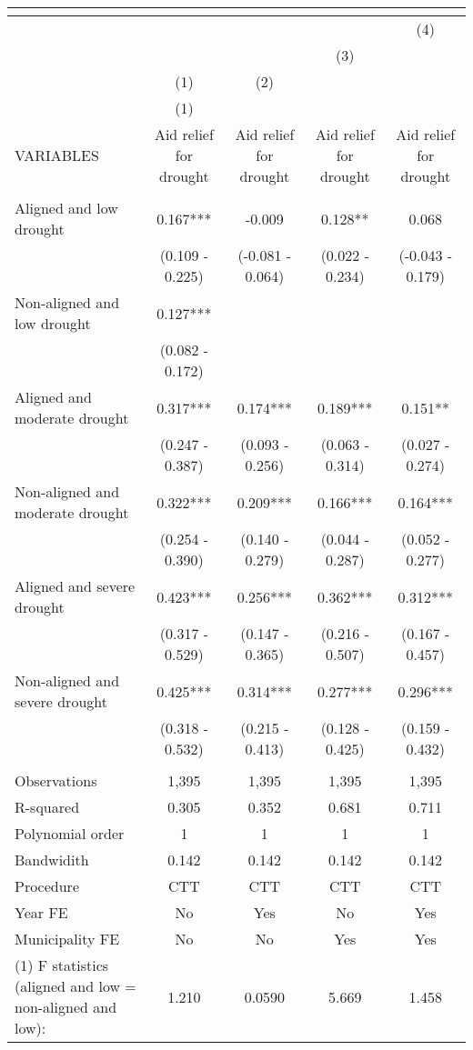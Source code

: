\begin{tabular}{lcccc}
\multicolumn{5}{c}{} \\ \hline
 &  &  &  & (4) \\
 &  &  & (3) &  \\
 & (1) & (2) &  &  \\
 & (1) &  &  &  \\
VARIABLES & Aid relief for drought & Aid relief for drought & Aid relief for drought & Aid relief for drought \\ \hline
 &  &  &  &  \\
Aligned and low drought & 0.167*** & -0.009 & 0.128** & 0.068 \\
 & (0.109 - 0.225) & (-0.081 - 0.064) & (0.022 - 0.234) & (-0.043 - 0.179) \\
Non-aligned and low drought & 0.127*** &  &  &  \\
 & (0.082 - 0.172) &  &  &  \\
Aligned and moderate drought & 0.317*** & 0.174*** & 0.189*** & 0.151** \\
 & (0.247 - 0.387) & (0.093 - 0.256) & (0.063 - 0.314) & (0.027 - 0.274) \\
Non-aligned and moderate drought & 0.322*** & 0.209*** & 0.166*** & 0.164*** \\
 & (0.254 - 0.390) & (0.140 - 0.279) & (0.044 - 0.287) & (0.052 - 0.277) \\
Aligned and severe drought & 0.423*** & 0.256*** & 0.362*** & 0.312*** \\
 & (0.317 - 0.529) & (0.147 - 0.365) & (0.216 - 0.507) & (0.167 - 0.457) \\
Non-aligned and severe drought & 0.425*** & 0.314*** & 0.277*** & 0.296*** \\
 & (0.318 - 0.532) & (0.215 - 0.413) & (0.128 - 0.425) & (0.159 - 0.432) \\
 &  &  &  &  \\
Observations & 1,395 & 1,395 & 1,395 & 1,395 \\
R-squared & 0.305 & 0.352 & 0.681 & 0.711 \\
Polynomial order & 1 & 1 & 1 & 1 \\
Bandwidith & 0.142 & 0.142 & 0.142 & 0.142 \\
Procedure & CTT & CTT & CTT & CTT \\
Year FE & No & Yes & No & Yes \\
Municipality FE & No & No & Yes & Yes \\
(1) F statistics (aligned and low = non-aligned and low): & 1.210 & 0.0590 & 5.669 & 1.458 \\

\end{tabular}
